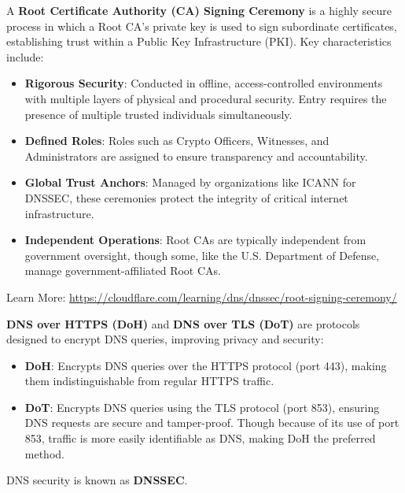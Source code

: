 \begin{Def}

    A \textbf{Root Certificate Authority (CA) Signing Ceremony} is a highly secure process in which a Root CA's private key is used to sign subordinate certificates, establishing trust within a Public Key Infrastructure (PKI). Key characteristics include:

    \begin{itemize}
        \item \textbf{Rigorous Security}: Conducted in offline, access-controlled environments with multiple layers of physical and procedural security. Entry requires the presence of multiple trusted individuals simultaneously.
        \item \textbf{Defined Roles}: Roles such as Crypto Officers, Witnesses, and Administrators are assigned to ensure transparency and accountability.
        \item \textbf{Global Trust Anchors}: Managed by organizations like ICANN for DNSSEC, these ceremonies protect the integrity of critical internet infrastructure.
        \item \textbf{Independent Operations}: Root CAs are typically independent from government oversight, though some, like the
        U.S. Department of Defense, manage government-affiliated Root CAs. 
    \end{itemize}
    Learn More: \href{https://www.cloudflare.com/learning/dns/dnssec/root-signing-ceremony/#:~:text=That%E2%80%99s%20the%20purpose%20of%20the%20Root%20Signing%20Ceremony%E2%80%94a,literally%20the%20key%20to%20the%20entire%20DNSSEC-protected%20Internet.}{https://cloudflare.com/learning/dns/dnssec/root-signing-ceremony/} \hfill \cite{cloudflare_root_signing}
\end{Def}

\newpage 

\noindent
\begin{Def}

    \textbf{DNS over HTTPS (DoH)} and \textbf{DNS over TLS (DoT)} are protocols designed to encrypt DNS queries, improving privacy and security:
    \begin{itemize}
        \item \textbf{DoH}: Encrypts DNS queries over the HTTPS protocol (port 443), making them indistinguishable from regular HTTPS traffic.
        \item \textbf{DoT}: Encrypts DNS queries using the TLS protocol (port 853), ensuring DNS requests are secure and tamper-proof.
        Though because of its use of port 853, traffic is more easily identifiable as DNS, making DoH the preferred method.
    \end{itemize}

    \noindent
    DNS security is known as \textbf{DNSSEC}. \hfill \cite{cloudflare_dns_tls}
\end{Def}













